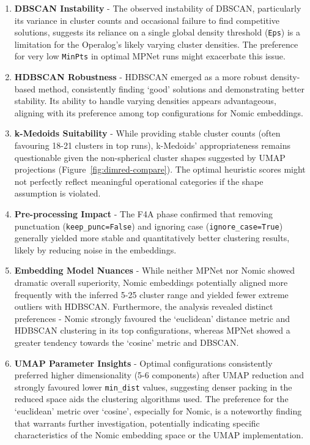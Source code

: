 \documentclass[10pt,oneside]{report}
\begin{document}
\begin{enumerate}
    \item \textbf{DBSCAN Instability} - The observed instability of DBSCAN, particularly its variance in cluster counts and occasional failure to find competitive solutions, suggests its reliance on a single global density threshold (\texttt{Eps}) is a limitation for the Operalog's likely varying cluster densities. The preference for very low \texttt{MinPts} in optimal MPNet runs might exacerbate this issue.

    \item \textbf{HDBSCAN Robustness} - HDBSCAN emerged as a more robust density-based method, consistently finding `good' solutions and demonstrating better stability. Its ability to handle varying densities \cite{campello2013density} appears advantageous, aligning with its preference among top configurations for Nomic embeddings.

    \item \textbf{k-Medoids Suitability} - While providing stable cluster counts (often favouring 18-21 clusters in top runs), k-Medoids' appropriateness remains questionable given the non-spherical cluster shapes suggested by UMAP projections (Figure~\ref{fig:dimred-compare}). The optimal heuristic scores might not perfectly reflect meaningful operational categories if the shape assumption is violated.

    \item \textbf{Pre-processing Impact} - The F4A phase confirmed that removing punctuation (\texttt{keep\_punc=False}) and ignoring case (\texttt{ignore\_case=True}) generally yielded more stable and quantitatively better clustering results, likely by reducing noise in the embeddings.

    \item \textbf{Embedding Model Nuances} - While neither MPNet nor Nomic showed dramatic overall superiority, Nomic embeddings potentially aligned more frequently with the inferred 5-25 cluster range and yielded fewer extreme outliers with HDBSCAN. Furthermore, the analysis revealed distinct preferences - Nomic strongly favoured the `euclidean' distance metric and HDBSCAN clustering in its top configurations, whereas MPNet showed a greater tendency towards the `cosine' metric and DBSCAN.

    \item \textbf{UMAP Parameter Insights} - Optimal configurations consistently preferred higher dimensionality (5-6 components) after UMAP reduction and strongly favoured lower \texttt{min_dist} values, suggesting denser packing in the reduced space aids the clustering algorithms used. The preference for the `euclidean' metric over `cosine', especially for Nomic, is a noteworthy finding that warrants further investigation, potentially indicating specific characteristics of the Nomic embedding space or the UMAP implementation.


\end{enumerate}
\end{document}
